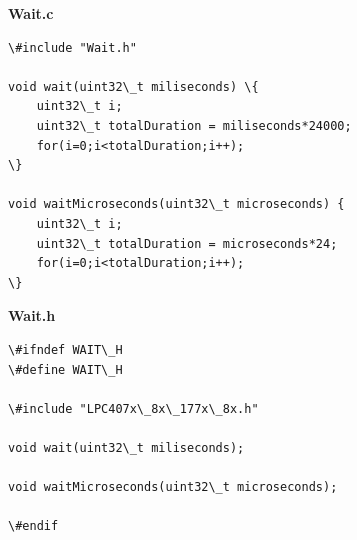 \documentclass{article}
\begin{document}
\linebreak
\textbf{Wait.c}
\begin{lstlisting}
\#include "Wait.h"

void wait(uint32\_t miliseconds) \{
	uint32\_t i;
	uint32\_t totalDuration = miliseconds*24000;
	for(i=0;i<totalDuration;i++);
\}

void waitMicroseconds(uint32\_t microseconds) {
	uint32\_t i;
	uint32\_t totalDuration = microseconds*24;
	for(i=0;i<totalDuration;i++);
\}
\end{lstlisting}
\linebreak
\textbf{Wait.h}
\begin{lstlisting}
\#ifndef WAIT\_H
\#define WAIT\_H

\#include "LPC407x\_8x\_177x\_8x.h"

void wait(uint32\_t miliseconds);

void waitMicroseconds(uint32\_t microseconds);

\#endif
\end{lstlisting}
\linebreak
\textbf{}
\begin{lstlisting}
\end{lstlisting}
\linebreak
\textbf{}
\begin{lstlisting}
\end{lstlisting}
\linebreak
\textbf{}
\begin{lstlisting}
\end{lstlisting}
\linebreak
\textbf{}
\begin{lstlisting}
\end{lstlisting}
\linebreak
\textbf{}
\begin{lstlisting}
\end{lstlisting}
\linebreak
\textbf{}
\begin{lstlisting}
\end{lstlisting}
\end{document}
